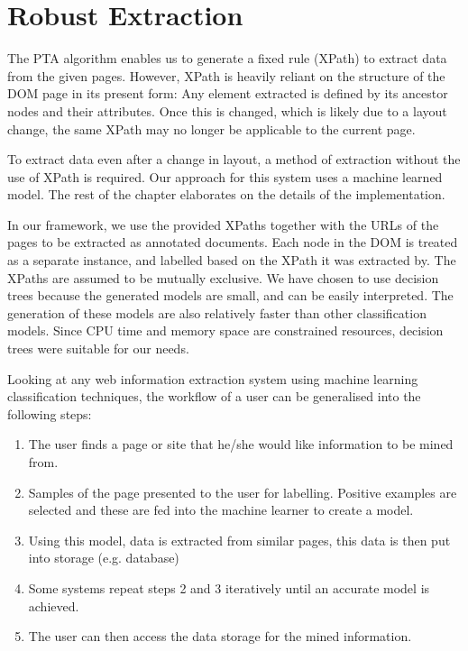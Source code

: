 \section{Robust Extraction}
\label{section:extraction}
The PTA algorithm enables us to generate a fixed rule (XPath) to extract data from the given pages.
However, XPath is heavily reliant on the structure of the DOM page in its present form: Any element
extracted is defined by its ancestor nodes and their attributes. Once this is changed, which is
likely due to a layout change, the same XPath may no longer be applicable to the current page. 

To extract data even after a change in layout, a method of extraction
without the use of XPath is required. Our approach for this system uses a machine learned model.
The rest of the chapter elaborates on the details of the implementation.

In our framework, we use the provided XPaths together with the URLs of the pages to be extracted
as annotated documents. Each node in the DOM is treated as a separate instance, and labelled
based on the XPath it was extracted by. The XPaths are assumed to be mutually exclusive. We have
chosen to use decision trees because the generated models are small, and can be easily interpreted.
The generation of these models are also relatively faster than other classification models. Since
CPU time and memory space are constrained resources, decision trees were suitable for our needs.

	
Looking at any web information extraction system using machine learning classification techniques,
the workflow of a user can be generalised into the following steps:
\begin{enumerate}
	\item The user finds a page or site that he/she would like information to be mined from.
	\item Samples of the page presented to the user for labelling. Positive examples are selected and these are fed into the machine learner to create a model.
	\item Using this model, data is extracted from similar pages, this data is then put into storage (e.g. database)
	\item Some systems repeat steps 2 and 3 iteratively until an accurate model is achieved. \label{repeatstep}
	\item The user can then access the data storage for the mined information.
\end{enumerate}

